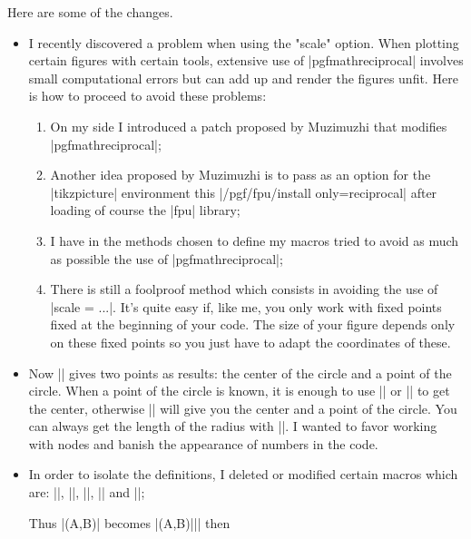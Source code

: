 Here are some of the changes. 
\vspace{1cm}
 \begin{itemize}\setlength{\itemsep}{10pt} 
  

\item I recently discovered a problem when using the "scale" option. When plotting certain figures with certain tools, extensive use of |pgfmathreciprocal| involves small computational errors but can add up and render the figures unfit. Here is how to proceed to avoid these problems:
\begin{enumerate}
  
  \item On my side I introduced a patch proposed by Muzimuzhi that modifies 
|pgfmathreciprocal|;

\item  Another idea proposed by Muzimuzhi is to pass as an option for the |tikzpicture| environment this |/pgf/fpu/install only={reciprocal}| after loading of course the |fpu| library;

\item I have in the methods chosen to define my macros tried to avoid as much as possible the use of |pgfmathreciprocal|;

\item  There is still a foolproof method which consists in avoiding the use of |scale = ...|. It's quite easy if, like me, you only work with fixed points fixed at the beginning of your code. The size of your figure depends only on these fixed points so you just have to adapt the coordinates of these.
\end{enumerate}

\item Now |\tkzDefCircle| gives two points as results: the center of the circle and a point of the circle. When a point of the circle is known, it is enough to use |\tkzGetPoint| or |\tkzGetFirstPoint|
to get the center, otherwise |\tkzGetPoints| will give you the center and a point of the circle. You can always get the length of the radius with |\tkzGetLength|. I wanted to favor working with nodes and banish the appearance of numbers in the code.

\item  In order to isolate the definitions, I deleted or modified certain macros which are: |\tkzDrawLine|, |\tkzDrawTriangle|, |\tkzDrawCircle|, |\tkzDrawSemiCircle| and  |\tkzDrawRectangle|;

Thus |\tkzDrawSquare(A,B)| becomes |\tkzDefSquare(A,B)||| then


\end{itemize}
